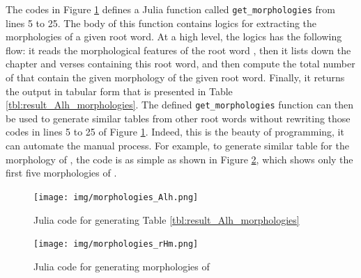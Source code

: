 The codes in Figure \ref{fig:result_Alh_morphologies} defines a Julia function called \verb|get_morphologies| from lines 5 to 25. The body of this function contains logics for extracting the morphologies of a given root word. At a high level, the logics has the following flow: it reads the morphological features of the root word , then it lists down the chapter and verses containing this root word, and then compute the total number of   that contain the given morphology of the given root word. Finally, it returns the output in tabular form that is presented in Table \ref{tbl:result_Alh_morphologies}. The defined \verb|get_morphologies| function can then be used to generate similar tables from other root words without rewriting those codes in lines 5 to 25 of Figure \ref{fig:result_Alh_morphologies}. Indeed, this is the beauty of programming, it can automate the manual process. For example, to generate similar table for the morphology of , the code is as simple as shown in Figure \ref{fig:result_rHm_morphologies}, which shows only the first five morphologies of .

\begin{figure}[!t]
    \centering
    \texttt{[image: img/morphologies\_Alh.png]}
    \caption{Julia code for generating Table \ref{tbl:result_Alh_morphologies}}
    \label{fig:result_Alh_morphologies}
\end{figure}

\begin{figure}[!t]
    \centering
    \texttt{[image: img/morphologies\_rHm.png]}
    \caption{Julia code for generating morphologies of }
    \label{fig:result_rHm_morphologies}
\end{figure}

